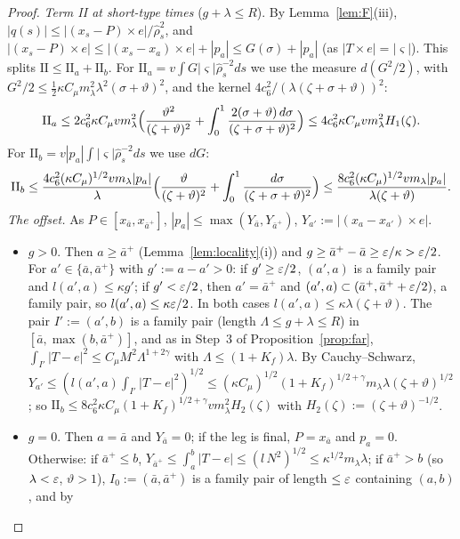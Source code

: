 \begin{proof}
\emph{Term II at short-type times} ($g+\lambda\le R$). By Lemma~\ref{lem:F}(iii), $|q(s)|\le|(x_s-P)\times e|/\hat\rho_s^2$,
and $|(x_s-P)\times e|\le|(x_s-x_a)\times e|+|p_a|\le G(\sigma)+|p_a|$ (as $|T\times e|=|\varsigma|$). This splits
$\mathrm{II}\le\mathrm{II}_a+\mathrm{II}_b$. For $\mathrm{II}_a=v\int G|\varsigma|\hat\rho_s^{-2}ds$ we use the measure
$d(G^2/2)$, with $G^2/2\le\frac12\kappa C_\mu m_\lambda^2\lambda^2(\sigma+\vartheta)^2$, and the kernel $4c_6^2/(\lambda(\zeta+\sigma+\vartheta))^2$:
\[
\mathrm{II}_a\le2c_6^2\kappa C_\mu vm_\lambda^2\Bigl(\frac{\vartheta^2}{(\zeta+\vartheta)^2}+\int_0^1\frac{2(\sigma+\vartheta)\,d\sigma}{(\zeta+\sigma+\vartheta)^2}\Bigr)
\le4c_6^2\kappa C_\mu vm_\lambda^2H_1(\zeta).
\]
For $\mathrm{II}_b=v|p_a|\int|\varsigma|\hat\rho_s^{-2}ds$ we use $dG$:
\[
\mathrm{II}_b\le\frac{4c_6^2(\kappa C_\mu)^{1/2}vm_\lambda|p_a|}{\lambda}\Bigl(\frac\vartheta{(\zeta+\vartheta)^2}+\int_0^1\frac{d\sigma}{(\zeta+\sigma+\vartheta)^2}\Bigr)
\le\frac{8c_6^2(\kappa C_\mu)^{1/2}vm_\lambda|p_a|}{\lambda(\zeta+\vartheta)} .
\]
\emph{The offset.} As $P\in[x_{\bar a},x_{\bar a^+}]$, $|p_a|\le\max(Y_{\bar a},Y_{\bar a^+})$, $Y_{a'}:=|(x_a-x_{a'})\times e|$.
\begin{itemize}
\setlength{\itemsep}{1pt}\setlength{\parskip}{0pt}
\item $g>0$. Then $a\ge\bar a^+$ (Lemma~\ref{lem:locality}(i)) and $g\ge\bar a^+-\bar a\ge\varepsilon/\kappa>\varepsilon/2$. For
$a'\in\{\bar a,\bar a^+\}$ with $g':=a-a'>0$: if $g'\ge\varepsilon/2$, $(a',a)$ is a family pair and $l(a',a)\le\kappa g'$; if
$g'<\varepsilon/2$, then $a'=\bar a^+$ and $(a',a)\subset(\bar a^+,\bar a^++\varepsilon/2)$, a family pair, so $l(a',a)\le\kappa\varepsilon/2$.
In both cases $l(a',a)\le\kappa\lambda(\zeta+\vartheta)$. The pair $I':=(a',b)$ is a family pair (length
$\Lambda\le g+\lambda\le R$) in $[\bar a,\max(b,\bar a^+)]$, and as in Step~3 of Proposition~\ref{prop:far},
$\int_{I'}|T-e|^2\le C_\mu M^2\Lambda^{1+2\gamma}$ with $\Lambda\le(1+K_f)\lambda$. By Cauchy--Schwarz,
$Y_{a'}\le(l(a',a)\int_{I'}|T-e|^2)^{1/2}\le(\kappa C_\mu)^{1/2}(1+K_f)^{1/2+\gamma}m_\lambda\lambda(\zeta+\vartheta)^{1/2}$;
so $\mathrm{II}_b\le8c_6^2\kappa C_\mu(1+K_f)^{1/2+\gamma}vm_\lambda^2H_2(\zeta)$ with $H_2(\zeta):=(\zeta+\vartheta)^{-1/2}$.
\item $g=0$. Then $a=\bar a$ and $Y_{\bar a}=0$; if the leg is final, $P=x_{\bar a}$ and $p_a=0$. Otherwise: if
$\bar a^+\le b$, $Y_{\bar a^+}\le\int_a^b|T-e|\le(l\,N^2)^{1/2}\le\kappa^{1/2}m_\lambda\lambda$; if $\bar a^+>b$ (so
$\lambda<\varepsilon$, $\vartheta>1$), $I_0:=(\bar a,\bar a^+)$ is a family pair of length $\le\varepsilon$ containing $(a,b)$, and by

\end{itemize}
\end{proof}
